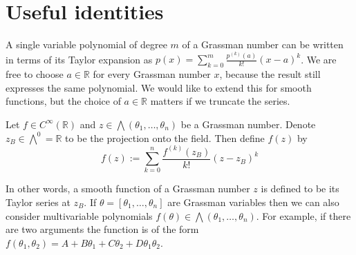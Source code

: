 \section{Useful identities}
A single variable polynomial of degree $m$ of a Grassman number can be written 
in terms of its Taylor expansion as 
$p(x) = \sum_{k=0}^{m} \frac{p^{(k)}(a)}{k!} (x-a)^k$.
We are free to choose $a\in\mathbb{R}$ for every Grassman number $x$, because the
result still expresses the same polynomial. We would like to extend this for
smooth functions, but the choice of $a\in\mathbb{R}$ matters if we truncate the
series. 
\begin{defn} \label{defn:grassman_function}
	Let $f\in C^\infty(\mathbb{R})$ and 
	$z \in \bigwedge(\theta_1,\ldots,\theta_n)$ be a Grassman number. 
	Denote $z_B \in \bigwedge^0 = \mathbb{R}$ to be the projection onto the 
	field. Then define $f(z)$ by
	 \[
	f(z) := \sum_{k=0}^{n} \frac{f^{(k)}(z_B)}{k!} (z-z_B)^k
	\] 
\end{defn}
In other words, a smooth function of a Grassman number $z$ is defined to be its
Taylor series at $z_B$. 
If $\theta=[\theta_1,\ldots,\theta_n]$ are Grassman variables then we can also
consider multivariable polynomials $f(\theta) \in
\bigwedge (\theta_1,\ldots,\theta_n)$. For example, if there are two arguments 
the function is of the form
$f(\theta_1,\theta_2)=A+B\theta_1+C\theta_2 + D\theta_1\theta_2$. 

